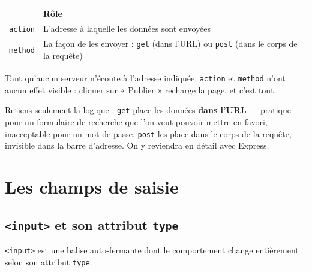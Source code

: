 \documentclass[a4paper,11pt]{article}
\newcommand{\hdr}[1]{\multicolumn{1}{l}{\color{white}\bfseries #1}}
\renewcommand{\arraystretch}{1.3}
\begin{document}
\begin{center}
\renewcommand{\arraystretch}{1.0}
\begin{tabularx}{\linewidth}{p{2.4cm}X}
  \toprule
  \rowcolor{uniNavy}
  \hdr{Attribut} & \hdr{Rôle} \\
  \midrule
  \rowcolor{uniPaper}
  \texttt{action} & L'adresse à laquelle les données sont envoyées \\
  \texttt{method} & La façon de les envoyer : \texttt{get} (dans l'URL) ou \texttt{post} (dans le corps de la requête) \\
  \bottomrule
\end{tabularx}
\end{center}

\begin{tcolorbox}[attention, title={Ces deux attributs ne serviront qu'en semaine 15}]
Tant qu'aucun serveur n'écoute à l'adresse indiquée, \texttt{action} et \texttt{method} n'ont aucun effet visible : cliquer sur « Publier » recharge la page, et c'est tout.

\vspace{3pt}
Retiens seulement la logique : \texttt{get} place les données \textbf{dans l'URL} --- pratique pour un formulaire de recherche que l'on veut pouvoir mettre en favori, inacceptable pour un mot de passe. \texttt{post} les place dans le corps de la requête, invisible dans la barre d'adresse. On y reviendra en détail avec Express.
\end{tcolorbox}

\section{Les champs de saisie}

\subsection{\texttt{<input>} et son attribut \texttt{type}}

\texttt{<input>} est une balise auto-fermante dont le comportement change entièrement selon son attribut \texttt{type}.
\end{document}
